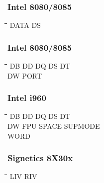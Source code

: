 \subsubsection{Intel 8080/8085} 
{\tt\begin{tabbing}
\hspace{3cm}\=\hspace{3cm}\=\hspace{3cm}\=\hspace{3cm}\=\kill
DATA       \> DS          \\
\end{tabbing}}

\subsubsection{Intel 8080/8085}
{\tt\begin{tabbing}
\hspace{3cm}\=\hspace{3cm}\=\hspace{3cm}\=\hspace{3cm}\=\kill
DB         \> DD          \> DQ          \> DS          \> DT \\
DW         \> PORT \\
\end{tabbing}}

\subsubsection{Intel i960}
{\tt\begin{tabbing}
\hspace{3cm}\=\hspace{3cm}\=\hspace{3cm}\=\hspace{3cm}\=\kill    
DB         \> DD          \> DQ          \> DS          \> DT \\
DW         \>             \> FPU         \> SPACE       \> SUPMODE \\
WORD \\
\end{tabbing}}

\subsubsection{Signetics 8X30x}
{\tt\begin{tabbing}
\hspace{3cm}\=\hspace{3cm}\=\hspace{3cm}\=\hspace{3cm}\=\kill
LIV        \> RIV         \\   
\end{tabbing}}

